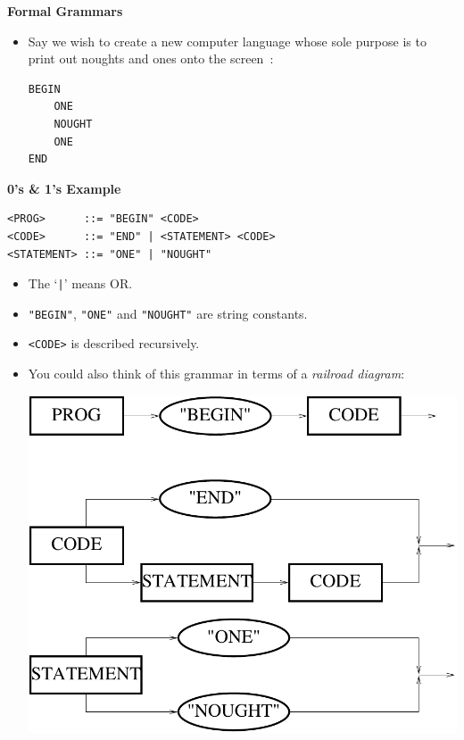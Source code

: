 \newpage
{\samepage
\begin{center}
{\Large{\bf Formal Grammars}}
\end{center}
\begin{itemize}

\item Say we wish to create a new computer language whose sole purpose
is to print out noughts and ones onto the screen~:

\begin{verbatim}
BEGIN
    ONE
    NOUGHT
    ONE
END
\end{verbatim}
\end{itemize}
}

\newpage
{\samepage
\begin{center}
{\Large{\bf 0's \& 1's Example}}
\end{center}
{\small
\begin{verbatim}
<PROG>      ::= "BEGIN" <CODE>
<CODE>      ::= "END" | <STATEMENT> <CODE>
<STATEMENT> ::= "ONE" | "NOUGHT"
\end{verbatim}
\begin{itemize}
\item The `\verb^|^' means OR.
\item \verb^"BEGIN"^, \verb^"ONE"^ and \verb^"NOUGHT"^ are string constants.
\item \verb^<CODE>^ is described recursively.
\item You could also think of this grammar in terms of a {\it railroad diagram}:
\begin{center}
\includegraphics{../Images/railroad.pdf}
\end{center}
\end{itemize}
}}

